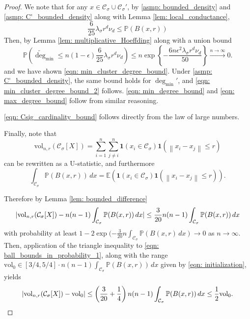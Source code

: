 \documentclass{article}
\DeclarePairedDelimiter\abs{\lvert}{\rvert}
\newcommand{\set}[1]{\left\{#1\right\}}
\newcommand{\vol}{\mathrm{vol}}
\newcommand{\norm}[1]{\left\lVert#1\right\rVert}
\newcommand{\1}{\mathbf{1}}
\newcommand{\Xbf}{X}             %
\newcommand{\Pbb}{\mathbb{P}}
\newcommand{\Ebb}{\mathbb{E}}
\newcommand{\Cset}{\mathcal{C}}
\newcommand{\Csig}{\Cset_{\sigma}}
\newcommand{\degminpr}{\deg_{\min}'}
\newcommand{\degminwt}{\widetilde{\deg}_{\min}}
\newcommand{\dx}{\,dx}
\theoremstyle{aldenthm}
\theoremstyle{aldenrmrk}
\begin{document}
\begin{proof}
	We note that for any $x \in \Csig \cup \Csig'$, by \ref{asmp: bounded_density} and \ref{asmp: C'_bounded_density} along with Lemma \ref{lem: local_conductance},
	\begin{equation*}
	\frac{6}{25} \lambda_{\sigma} r^d \nu_d \leq \Pbb(B(x,r))
	\end{equation*}
	Then, by Lemma \ref{lem: multiplicative_Hoeffding} along with a union bound
	\begin{equation*}
	\Pbb \left(\degminwt \leq n (1 - \epsilon) \frac{6}{25}  \lambda_{\sigma} r^d \nu_d \right) \leq n \exp\set{- \frac{6 n \epsilon^2  \lambda_{\sigma} r^d \nu_d}{50} } \overset{n \to \infty}{\longrightarrow} 0.
	\end{equation*}
	and we have shown \eqref{eqn: min_cluster_degree_bound}. Under \ref{asmp: C'_bounded_density}, the same bound holds for $\degminpr$, and \eqref{eqn: min_cluster_degree_bound_2} follows. \eqref{eqn: min_degree_bound} and \eqref{eqn: max_degree_bound} follow from similar reasoning.
	
	\eqref{eqn: Csig_cardinality_bound} follows directly from the law of large numbers.
	
	Finally, note that
	\begin{equation*}
	\vol_{n,r}(\Csig[\Xbf]) = \sum_{i = 1}^{n} \sum_{j \neq i}^{n} \1(x_i \in \Csig) \1(\norm{x_i - x_j} \leq r)
	\end{equation*}
	can be rewritten as a U-statistic, and furthermore
	\begin{equation*}
	\int_{\Csig} \Pbb(B(x,r)) \dx = \Ebb\left(\1(x_i \in \Csig) \1(\norm{x_i - x_j} \leq r)\right).
	\end{equation*}
	
	Therefore by Lemma \ref{lem: bounded_difference}
	\begin{equation}
	\label{eqn: ball_bounds_in_probability_1}
	\abs{\vol_{n,r}(\Csig[\Xbf]) - n(n-1)\int_{\Csig} \Pbb(B(x,r)) \dx }\leq \frac{3}{20}n(n-1)\int_{\Csig} \Pbb(B(x,r)) \dx 
	\end{equation}
	with probability at least $1 - 2\exp(-\frac{3}{20}n \int_{\Csig} \Pbb(B(x,r) \dx) \to 0$ as $n \to \infty$. Then, application of the triangle inequality to \eqref{eqn: ball_bounds_in_probability_1}, along with the range $\vol_0 \in [3/4,5/4] \cdot n(n-1)\int_{\Csig} \Pbb(B(x,r)) \dx$ given by \eqref{eqn: initialization}, yields
	\begin{equation*}
	\abs{\vol_{n,r}(\Csig[\Xbf]) - \vol_0} \leq \left(\frac{3}{20} + \frac{1}{4}\right) n(n-1)\int_{\Csig} \Pbb(B(x,r)) \dx \leq \frac{1}{2} \vol_0.
	\end{equation*}
	

\end{proof}
\end{document}
